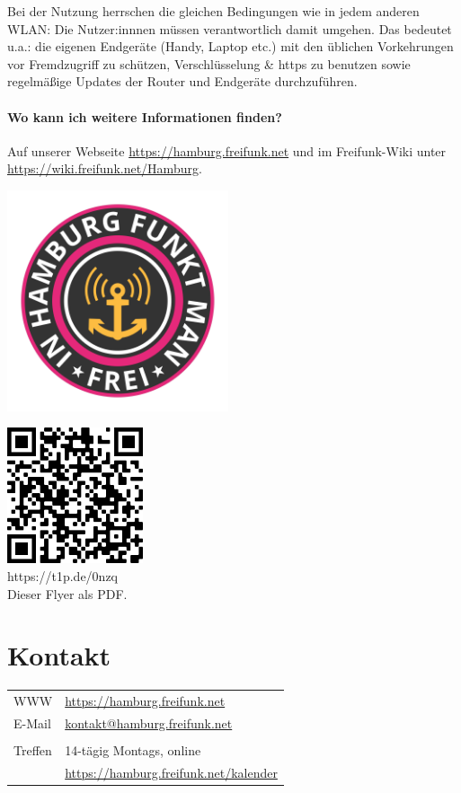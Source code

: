 \documentclass[10pt,a4paper,notumble]{leaflet}
\begin{document}
Bei der Nutzung herrschen die gleichen Bedingungen wie in jedem anderen WLAN: Die Nutzer:innnen müssen verantwortlich damit umgehen. Das bedeutet u.a.: die eigenen Endgeräte (Handy, Laptop etc.) mit den üblichen Vorkehrungen vor Fremdzugriff zu schützen, Verschlüsselung \& https zu benutzen sowie regelmäßige Updates der Router und Endgeräte durchzuführen.

\paragraph{Wo kann ich weitere Informationen finden?} Auf unserer Webseite \href{https://hamburg.freifunk.net}{https://hamburg.freifunk.net} und im Freifunk-Wiki unter \href{https://wiki.freifunk.net/Hamburg}{https://wiki.freifunk.net/Hamburg}.

\newpage
\begin{center}
\includegraphics[width=65mm]{in-hamburg-funkt-man-frei.png}
\end{center}
\vspace{3em}
\begin{center}
\includegraphics[width=40mm]{qr.png}\\
\footnotesize https://t1p.de/0nzq\\Dieser Flyer als PDF.
\end{center}
\vfill
\section{Kontakt}
\begin{tabular}{ll}
WWW & \href{https://hamburg.freifunk.net}{https://hamburg.freifunk.net}\\
E-Mail & \href{mailto:kontakt@hamburg.freifunk.net}{kontakt@hamburg.freifunk.net}\\
        \\
Treffen & 14-tägig Montags, online\\
	& \href{https://hamburg.freifunk.net/kalender}{\small https://hamburg.freifunk.net/kalender}
\end{tabular}
\end{document}
